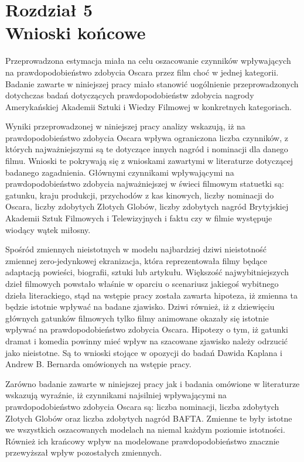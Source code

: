 \newpage
\chapter*{Rozdział 5 \\ \vspace{1cm} Wnioski końcowe}
 
Przeprowadzona estymacja miała na celu oszacowanie czynników wpływających na prawdopodobieństwo zdobycia Oscara przez film choć w jednej kategorii. Badanie zawarte w niniejszej pracy miało stanowić uogólnienie przeprowadzonych dotychczas badań dotyczących prawdopodobieństw zdobycia nagrody Amerykańskiej Akademii Sztuki i Wiedzy Filmowej w konkretnych kategoriach. 

Wyniki przeprowadzonej w niniejszej pracy analizy wskazują, iż na prawdopodobieństwo zdobycia Oscara wpływa ograniczona liczba czynników, z których najważniejszymi są te dotyczące innych nagród i nominacji dla danego filmu. Wnioski te pokrywają się z wnioskami zawartymi w literaturze dotyczącej badanego zagadnienia. Głównymi czynnikami wpływającymi na prawdopodobieństwo zdobycia najważniejszej w świeci filmowym statuetki są: gatunku, kraju produkcji, przychodów z kas kinowych, liczby nominacji do Oscara, liczby zdobytych Złotych Globów, liczby zdobytych nagród Brytyjskiej Akademii Sztuk Filmowych i Telewizyjnych i faktu czy w filmie występuje wiodący wątek miłosny. 

Spośród zmiennych nieistotnych w modelu najbardziej dziwi nieistotność zmiennej zero-jedynkowej ekranizacja, która reprezentowała filmy będące adaptacją powieści, biografii, sztuki lub artykułu. Większość najwybitniejszych dzieł filmowych powstało właśnie w oparciu o scenariusz jakiegoś wybitnego dzieła literackiego, stąd na wstępie pracy została zawarta hipoteza, iż zmienna ta będzie istotnie wpływać na badane zjawisko. Dziwi również, iż z dziewięciu głównych gatunków filmowych tylko filmy animowane okazały się istotnie wpływać na prawdopodobieństwo zdobycia Oscara. Hipotezy o tym, iż gatunki dramat i komedia powinny mieć wpływ na szacowane zjawisko należy odrzucić jako nieistotne. Są to wnioski stojące w opozycji do badań Dawida Kaplana i Andrew B. Bernarda omówionych na wstępie pracy.

Zarówno badanie zawarte w niniejszej pracy jak i badania omówione w literaturze wskazują wyraźnie, iż czynnikami najsilniej wpływającymi na prawdopodobieństwo zdobycia Oscara są: liczba nominacji, liczba zdobytych Złotych Globów oraz liczba zdobytych nagród BAFTA. Zmienne te były istotne we wszystkich oszacowanych modelach na niemal każdym poziomie istotności. Również ich krańcowy wpływ na modelowane prawdopodobieństwo znacznie przewyższał wpływ pozostałych zmiennych.

